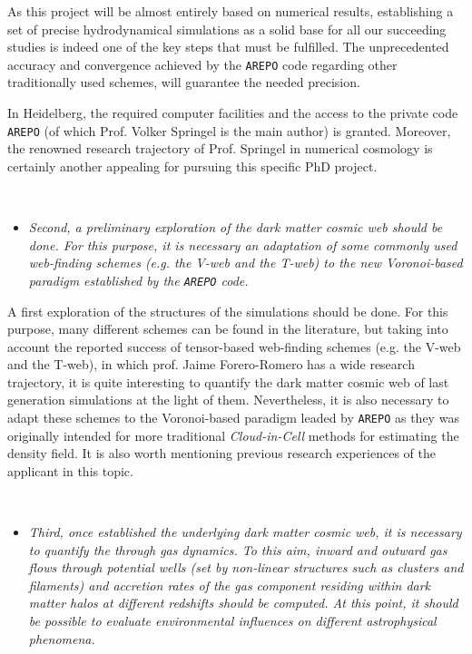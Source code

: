 \documentclass[a4,useAMS,usenatbib,usegraphicx,12pt]{article}
\begin{document}
As this project will be almost entirely based on numerical results, 
establishing a set of precise hydrodynamical simulations as a solid base for 
all our succeeding studies is indeed one of the key steps that must be 
fulfilled. The unprecedented accuracy and convergence achieved by the 
\texttt{AREPO} code regarding other traditionally used schemes, will guarantee 
the needed precision.


In Heidelberg, the required computer facilities and the access to the private 
code \texttt{AREPO} (of which Prof. Volker Springel is the main author) is 
granted. Moreover, the renowned research trajectory of Prof. Springel in 
numerical cosmology is certainly another appealing for pursuing this specific 
PhD project.

\

\begin{itemize}

\item[\checkmark] \textit{Second, a preliminary exploration of the dark matter
cosmic web should be done. For this purpose, it is necessary an adaptation of 
some commonly used web-finding schemes (e.g. the V-web and the T-web) to the 
new Voronoi-based paradigm established by the \texttt{AREPO} code.}

\end{itemize}


A first exploration of the structures of the simulations should be done. For
this purpose, many different schemes can be found in the literature, 
but taking into account the reported success of tensor-based 
web-finding schemes (e.g. the V-web and the T-web), in which prof. Jaime 
Forero-Romero has a wide research trajectory, it is quite interesting to 
quantify the dark matter cosmic web of last generation simulations at the light
of them. Nevertheless, it is also necessary to adapt these schemes to the 
Voronoi-based paradigm leaded by \texttt{AREPO} as they was originally intended 
for more traditional \textit{Cloud-in-Cell} methods for estimating the density 
field. It is also worth mentioning previous research experiences of the 
applicant in this topic.

\

\begin{itemize}

\item[\checkmark] \textit{Third, once established the underlying dark matter 
cosmic web, it is necessary to quantify the through gas dynamics. To this aim, 
inward and outward gas flows through potential wells (set by non-linear 
structures such as clusters and filaments) and accretion rates of the gas 
component residing within dark matter halos at different redshifts should be 
computed. At this point, it should be possible to evaluate environmental
influences on different astrophysical phenomena. }

\end{itemize}
\end{document}
